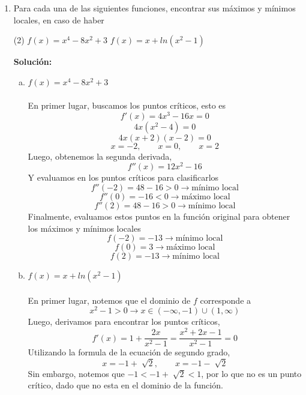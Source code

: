 \documentclass[12pt]{article}
\newenvironment{solucion}
{\begin{mdframed}[backgroundcolor=black!10]
		{\bf Solución:}\\
	}
	{
	\end{mdframed}
}
\newenvironment{preguntas}
{\begin{enumerate}\itemsep12pt
	}
	{
	\end{enumerate}
}
\newcommand{\ra}{\rightarrow}
\begin{document}
\begin{preguntas}
Suponga que en el instante $t_0$ la presión $P$ es igual a 8 $atm$ y que esta aumenta a razón de 0,1 $atm/min$. Además se sabe que en ese mismo instante el volumen $V$ es de 10 litros y que este disminuye a razón de 0,15 $lt/min$.\\
Determine la razón de cambio de $T$, con respecto al tiempoo, en el instante $t_0$, sabiendo que la constante $n = 10\ mol$.
\begin{solucion}
En el instante $t_0$, tenemos
$$P = 8\ atm, \qquad P' = 0.1\ atm/min$$
$$V = 10\ l, \qquad V' = -0.15\ l/min$$
Además, estamos buscando
$$T'(t=t_0)$$
Olvidemos esto por ahora y veamos como se relacionan las variables en cualquier instante $t$.\\

En cualquier instante $t$, se cumple que
$$PV = 10 \cdot 0.0821 \cdot T \ra PV = 0.821 T $$
Derivando esto en función del tiempo (de manera implícita para todas las variables), tenemos
$$P'V + V'P = 0.821T'$$
Despejamos $T'$, ya que es lo que queremos obtener,
$$T' = \dfrac{P'V + V'P}{0.821}$$
Finalmente, evaluamos en $t_0$, es decir, reemplazamos los datos entregados en el enunciado, esto es
$$T'(t=t_0) = \dfrac{8 \cdot (-0.15) + 10 \cdot 0.1)}{0.821} = -\dfrac{0.2}{0.821} = -0.243$$
Por lo que la razón de cambio de la temperatura es $-0.243\ K/min$
\end{solucion}
\item Para cada una de las siguientes funciones, encontrar sus máximos y mínimos locales, en caso de haber
\begin{tasks}(2)
\task $f(x) = x^4 - 8x^2 + 3$
\task $f(x)=x+ln(x^2-1)$
\end{tasks}
\begin{solucion}

\begin{enumerate}[a)]
\item $f(x) = x^4 - 8x^2 + 3$\\
\\
En primer lugar, buscamos los puntos críticos, esto es
$$f'(x) = 4x^3 - 16x = 0$$
$$4x(x^2 - 4) = 0$$
$$4x(x+2)(x-2) = 0$$
$$x = -2, \qquad x = 0, \qquad x = 2$$
Luego, obtenemos la segunda derivada,
$$f''(x) = 12x^2 - 16$$
Y evaluamos en los puntos críticos para clasificarlos
$$f''(-2) = 48 - 16 > 0 \ra \text{mínimo local}$$
$$f''(0) = -16 < 0 \ra \text{máximo local}$$
$$f''(2) = 48 - 16 > 0 \ra \text{mínimo local}$$
Finalmente, evaluamos estos puntos en la función original para obtener los máximos y mínimos locales
$$f(-2) = -13 \ra \text{mínimo local}$$
$$f(0) = 3 \ra \text{máximo local}$$
$$f(2) = -13 \ra \text{mínimo local}$$
\item $f(x)=x+ln(x^2-1)$\\
\\
En primer lugar, notemos que el dominio de $f$ corresponde a 
$$x^2-1 > 0 \ra x \in (-\infty, -1) \cup (1, \infty)$$
Luego, derivamos para encontrar los puntos críticos,
$$f'(x) = 1 + \dfrac{2x}{x^2-1} = \dfrac{x^2 +2x -1}{x^2-1} = 0$$
Utilizando la formula de la ecuación de segundo grado,
$$x = -1 + \sqrt[]{2}, \qquad x = -1 - \sqrt[]{2}$$
Sin embargo, notemos que $-1 < -1 + \sqrt[]{2} < 1$, por lo que no es un punto crítico, dado que no esta en el dominio de la función.


\end{enumerate}
\end{solucion}
\end{preguntas}
\end{document}
